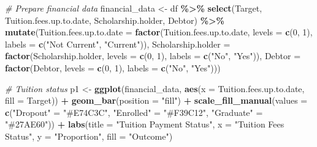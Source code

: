 \documentclass[
]{article}
\newenvironment{Shaded}{\begin{snugshade}}{\end{snugshade}}
\newcommand{\AttributeTok}[1]{\textcolor[rgb]{0.13,0.29,0.53}{#1}}
\newcommand{\CommentTok}[1]{\textcolor[rgb]{0.56,0.35,0.01}{\textit{#1}}}
\newcommand{\DecValTok}[1]{\textcolor[rgb]{0.00,0.00,0.81}{#1}}
\newcommand{\FunctionTok}[1]{\textcolor[rgb]{0.13,0.29,0.53}{\textbf{#1}}}
\newcommand{\NormalTok}[1]{#1}
\newcommand{\OtherTok}[1]{\textcolor[rgb]{0.56,0.35,0.01}{#1}}
\newcommand{\SpecialCharTok}[1]{\textcolor[rgb]{0.81,0.36,0.00}{\textbf{#1}}}
\newcommand{\StringTok}[1]{\textcolor[rgb]{0.31,0.60,0.02}{#1}}
\begin{document}
\begin{Shaded}
\begin{Highlighting}[]
\CommentTok{\# Prepare financial data}
\NormalTok{financial\_data }\OtherTok{\textless{}{-}}\NormalTok{ df }\SpecialCharTok{\%\textgreater{}\%}
  \FunctionTok{select}\NormalTok{(Target, Tuition.fees.up.to.date, Scholarship.holder, Debtor) }\SpecialCharTok{\%\textgreater{}\%}
  \FunctionTok{mutate}\NormalTok{(}\AttributeTok{Tuition.fees.up.to.date =} \FunctionTok{factor}\NormalTok{(Tuition.fees.up.to.date,}
                                           \AttributeTok{levels =} \FunctionTok{c}\NormalTok{(}\DecValTok{0}\NormalTok{, }\DecValTok{1}\NormalTok{),}
                                           \AttributeTok{labels =} \FunctionTok{c}\NormalTok{(}\StringTok{"Not Current"}\NormalTok{, }\StringTok{"Current"}\NormalTok{)),}
         \AttributeTok{Scholarship.holder =} \FunctionTok{factor}\NormalTok{(Scholarship.holder,}
                                     \AttributeTok{levels =} \FunctionTok{c}\NormalTok{(}\DecValTok{0}\NormalTok{, }\DecValTok{1}\NormalTok{),}
                                     \AttributeTok{labels =} \FunctionTok{c}\NormalTok{(}\StringTok{"No"}\NormalTok{, }\StringTok{"Yes"}\NormalTok{)),}
         \AttributeTok{Debtor =} \FunctionTok{factor}\NormalTok{(Debtor,}
                        \AttributeTok{levels =} \FunctionTok{c}\NormalTok{(}\DecValTok{0}\NormalTok{, }\DecValTok{1}\NormalTok{),}
                        \AttributeTok{labels =} \FunctionTok{c}\NormalTok{(}\StringTok{"No"}\NormalTok{, }\StringTok{"Yes"}\NormalTok{)))}

\CommentTok{\# Tuition status}
\NormalTok{p1 }\OtherTok{\textless{}{-}} \FunctionTok{ggplot}\NormalTok{(financial\_data, }\FunctionTok{aes}\NormalTok{(}\AttributeTok{x =}\NormalTok{ Tuition.fees.up.to.date, }\AttributeTok{fill =}\NormalTok{ Target)) }\SpecialCharTok{+}
  \FunctionTok{geom\_bar}\NormalTok{(}\AttributeTok{position =} \StringTok{"fill"}\NormalTok{) }\SpecialCharTok{+}
  \FunctionTok{scale\_fill\_manual}\NormalTok{(}\AttributeTok{values =} \FunctionTok{c}\NormalTok{(}\StringTok{"Dropout"} \OtherTok{=} \StringTok{"\#E74C3C"}\NormalTok{,}
                                \StringTok{"Enrolled"} \OtherTok{=} \StringTok{"\#F39C12"}\NormalTok{,}
                                \StringTok{"Graduate"} \OtherTok{=} \StringTok{"\#27AE60"}\NormalTok{)) }\SpecialCharTok{+}
  \FunctionTok{labs}\NormalTok{(}\AttributeTok{title =} \StringTok{"Tuition Payment Status"}\NormalTok{,}
       \AttributeTok{x =} \StringTok{"Tuition Fees Status"}\NormalTok{, }\AttributeTok{y =} \StringTok{"Proportion"}\NormalTok{, }\AttributeTok{fill =} \StringTok{"Outcome"}\NormalTok{)}


\end{Highlighting}
\end{Shaded}
\end{document}

